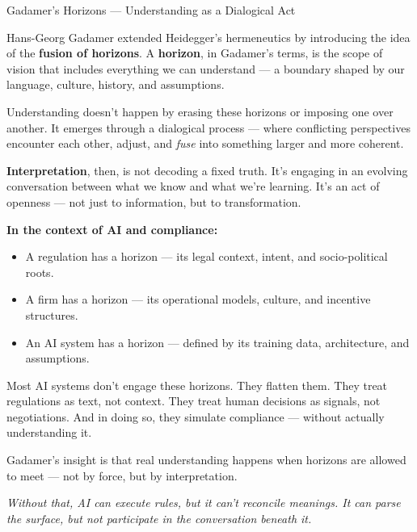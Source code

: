 \begin{PhilosophicalSidebar}{Gadamer's Horizons — Understanding as a Dialogical Act}

  Hans-Georg Gadamer extended Heidegger’s hermeneutics by introducing the idea of the \textbf{fusion of horizons}.  
  A \textbf{horizon}, in Gadamer’s terms, is the scope of vision that includes everything we can understand — 
  a boundary shaped by our language, culture, history, and assumptions.
  
  \medskip
  
  Understanding doesn’t happen by erasing these horizons or imposing one over another.  
  It emerges through a dialogical process — where conflicting perspectives encounter each other, 
  adjust, and \textit{fuse} into something larger and more coherent.  
  
  \medskip
  
  \textbf{Interpretation}, then, is not decoding a fixed truth.  
  It’s engaging in an evolving conversation between what we know and what we’re learning.  
  It’s an act of openness — not just to information, but to transformation.
  
  \medskip
  
  \textbf{In the context of AI and compliance:}
  
  \begin{itemize}
    \item A regulation has a horizon — its legal context, intent, and socio-political roots.
    \item A firm has a horizon — its operational models, culture, and incentive structures.
    \item An AI system has a horizon — defined by its training data, architecture, and assumptions.
  \end{itemize}
  
  \medskip
  
  Most AI systems don’t engage these horizons.  
  They flatten them.  
  They treat regulations as text, not context.  
  They treat human decisions as signals, not negotiations.  
  And in doing so, they simulate compliance — without actually understanding it.
  
  \medskip
  
  Gadamer’s insight is that real understanding happens when horizons are allowed to meet —  
  not by force, but by interpretation.
  
  \textit{Without that, AI can execute rules, but it can’t reconcile meanings.  
  It can parse the surface, but not participate in the conversation beneath it.}
  
\end{PhilosophicalSidebar}

